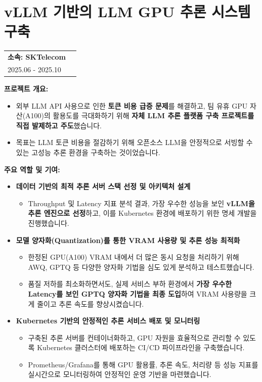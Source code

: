 \documentclass[letterpaper,11pt]{article}
\makeatletter
\newcommand{\resumeProject}[2]{
  \vspace{-1pt}\item
    \begin{tabular*}{0.97\textwidth}[t]{l@{\extracolsep{\fill}}r}
      \textbf{#1} \\
      \small{#2} \\
    \end{tabular*}\vspace{-5pt}
}
\makeatother
\begin{document}
\section{\textbf{vLLM 기반의 LLM GPU 추론 시스템 구축}}
  \resumeProjectListStart
    \resumeProject
    {\textbf{소속}: SKTelecom} {2025.06 - 2025.10}

    {
      \textbf{프로젝트 개요:}
      \begin{itemize}[leftmargin=*]
          \item 외부 LLM API 사용으로 인한 \textbf{토큰 비용 급증 문제}를 해결하고, 팀 유휴 GPU 자산(A100)의 활용도를 극대화하기 위해 \textbf{자체 LLM 추론 플랫폼 구축 프로젝트를 직접 발제하고 주도}했습니다.
          \item 목표는 LLM 토큰 비용을 절감하기 위해 오픈소스 LLM을 안정적으로 서빙할 수 있는 고성능 추론 환경을 구축하는 것이었습니다.
      \end{itemize}

      \textbf{주요 역할 및 기여:}
      \begin{itemize}[leftmargin=*]
          \item \textbf{데이터 기반의 최적 추론 서버 스택 선정 및 아키텍처 설계}
              \begin{itemize}[leftmargin=*, label=$\circ$]
                  \item Throughput 및 Latency 지표 분석 결과, 가장 우수한 성능을 보인 \textbf{vLLM을 추론 엔진으로 선정}하고, 이를 Kubernetes 환경에 배포하기 위한 명세 개발을 진행했습니다.
              \end{itemize}

          \item \textbf{모델 양자화(Quantization)를 통한 VRAM 사용량 및 추론 성능 최적화}
              \begin{itemize}[leftmargin=*, label=$\circ$]
                  \item 한정된 GPU(A100) VRAM 내에서 더 많은 동시 요청을 처리하기 위해 AWQ, GPTQ 등 다양한 양자화 기법을 심도 있게 분석하고 테스트했습니다.
                  \item 품질 저하를 최소화하면서도, 실제 서비스 부하 환경에서 \textbf{가장 우수한 Latency를 보인 GPTQ 양자화 기법을 최종 도입}하여 VRAM 사용량을 크게 줄이고 추론 속도를 향상시켰습니다.
              \end{itemize}
              
          \item \textbf{Kubernetes 기반의 안정적인 추론 서비스 배포 및 모니터링}
              \begin{itemize}[leftmargin=*, label=$\circ$]
                  \item 구축된 추론 서버를 컨테이너화하고, GPU 자원을 효율적으로 관리할 수 있도록 Kubernetes 클러스터에 배포하는 CI/CD 파이프라인을 구축했습니다.
                  \item Prometheus/Grafana를 통해 GPU 활용률, 추론 속도, 처리량 등 성능 지표를 실시간으로 모니터링하여 안정적인 운영 기반을 마련했습니다.
              \end{itemize}
      \end{itemize}

}
\end{document}
